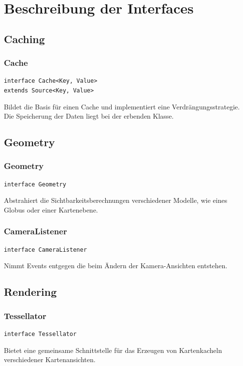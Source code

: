\documentclass[10pt]{scrreprt}
\begin{document}
\newpage


\chapter{Beschreibung der Interfaces}

\section{Caching}
\subsection*{Cache}
\begin{lstlisting}
interface Cache<Key, Value>
extends Source<Key, Value>
\end{lstlisting}
Bildet die Basis für einen Cache und implementiert eine Verdrängungsstrategie. Die Speicherung der Daten liegt bei der erbenden Klasse.\\


\vspace{5mm}
\section{Geometry}
\subsection*{Geometry}
\begin{lstlisting}
interface Geometry
\end{lstlisting}
Abstrahiert die Sichtbarkeitsberechnungen verschiedener Modelle, wie eines Globus oder einer Kartenebene.\\

\vspace{5mm}
\subsection*{CameraListener}
\begin{lstlisting}
interface CameraListener
\end{lstlisting}
Nimmt Events entgegen die beim Ändern der Kamera-Ansichten entstehen.\\


\vspace{5mm}
\section{Rendering}
\subsection*{Tessellator}
\begin{lstlisting}
interface Tessellator
\end{lstlisting}
Bietet eine gemeinsame Schnittstelle für das Erzeugen von Kartenkacheln verschiedener Kartenansichten.\\
\end{document}
